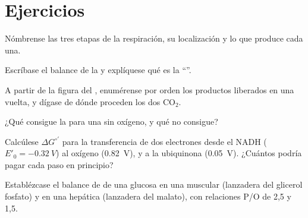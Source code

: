 \section{Ejercicios}

\begin{exercise}[$\star$]\label{exo:b1:respiration-fermentation:1}
Nómbrense las tres etapas de la respiración, su localización y lo que
produce cada una.
\end{exercise}

\begin{exercise}[$\star$]\label{exo:b1:respiration-fermentation:2}
Escríbase el balance de la  y explíquese qué es la
``''.
\end{exercise}

\begin{exercise}[$\star$]\label{exo:b1:respiration-fermentation:3}
A partir de la figura del , enumérense por orden los productos
liberados en una vuelta, y dígase de dónde proceden los dos
$\mathrm{CO_2}$.
\end{exercise}

\begin{exercise}[$\star$]\label{exo:b1:respiration-fermentation:4}
¿Qué consigue la  para una  sin oxígeno, y qué no
consigue?
\end{exercise}

\begin{exercise}[$\star\star$]\label{exo:b1:respiration-fermentation:5}
Calcúlese $\Delta G^{\circ\prime}$ para la transferencia de dos electrones
desde el NADH ($E'_0 = \qty{-0.32}{V}$) al oxígeno (\qty{+0.82}{V}), y a la
ubiquinona (\qty{+0.05}{V}). ¿Cuántos  podría pagar cada paso en
principio?
\end{exercise}

\begin{exercise}[$\star\star$]\label{exo:b1:respiration-fermentation:6}
Establézcase el balance de  de una glucosa en una  muscular
(lanzadera del glicerol fosfato) y en una  hepática (lanzadera del
malato), con relaciones P/O de 2,5 y 1,5.
\end{exercise}

